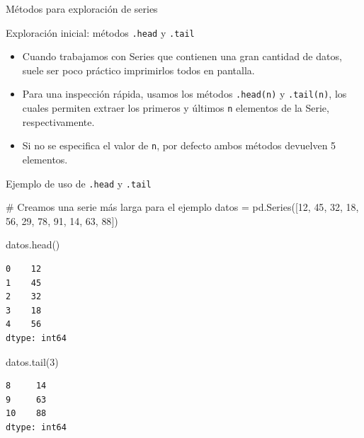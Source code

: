 \documentclass[
  ignorenonframetext,
  aspectratio=169,
  spanish,
]{beamer}
\newenvironment{Shaded}{\begin{snugshade}}{\end{snugshade}}
\newcommand{\CommentTok}[1]{\textcolor[rgb]{0.37,0.37,0.37}{#1}}
\newcommand{\DecValTok}[1]{\textcolor[rgb]{0.68,0.00,0.00}{#1}}
\newcommand{\NormalTok}[1]{\textcolor[rgb]{0.00,0.23,0.31}{#1}}
\newcommand{\OperatorTok}[1]{\textcolor[rgb]{0.37,0.37,0.37}{#1}}
\begin{document}
\begin{frame}[fragile]{Métodos para exploración de series}
\label{muxe9todos-para-exploraciuxf3n-de-series}
\begin{block}{Exploración inicial: métodos \texttt{.head} y
\texttt{.tail}}
\label{exploraciuxf3n-inicial-muxe9todos-.head-y-.tail}
\begin{itemize}
\item
  Cuando trabajamos con Series que contienen una gran cantidad de datos,
  suele ser poco práctico imprimirlos todos en pantalla.
\item
  Para una inspección rápida, usamos los métodos \texttt{.head(n)} y
  \texttt{.tail(n)}, los cuales permiten extraer los primeros y últimos
  \texttt{n} elementos de la Serie, respectivamente.
\item
  Si no se especifica el valor de \texttt{n}, por defecto ambos métodos
  devuelven 5 elementos.
\end{itemize}
\end{block}

\begin{block}{Ejemplo de uso de \texttt{.head} y \texttt{.tail}}
\label{ejemplo-de-uso-de-.head-y-.tail}
\begin{Shaded}
\begin{Highlighting}[]
\CommentTok{\# Creamos una serie más larga para el ejemplo}
\NormalTok{datos }\OperatorTok{=}\NormalTok{ pd.Series([}\DecValTok{12}\NormalTok{, }\DecValTok{45}\NormalTok{, }\DecValTok{32}\NormalTok{, }\DecValTok{18}\NormalTok{, }\DecValTok{56}\NormalTok{, }\DecValTok{29}\NormalTok{, }\DecValTok{78}\NormalTok{, }\DecValTok{91}\NormalTok{, }\DecValTok{14}\NormalTok{, }\DecValTok{63}\NormalTok{, }\DecValTok{88}\NormalTok{])}

\NormalTok{datos.head() }
\end{Highlighting}
\end{Shaded}

\begin{verbatim}
0    12
1    45
2    32
3    18
4    56
dtype: int64
\end{verbatim}

\begin{Shaded}
\begin{Highlighting}[]
\NormalTok{datos.tail(}\DecValTok{3}\NormalTok{) }
\end{Highlighting}
\end{Shaded}

\begin{verbatim}
8     14
9     63
10    88
dtype: int64
\end{verbatim}
\end{block}


\end{frame}
\end{document}
